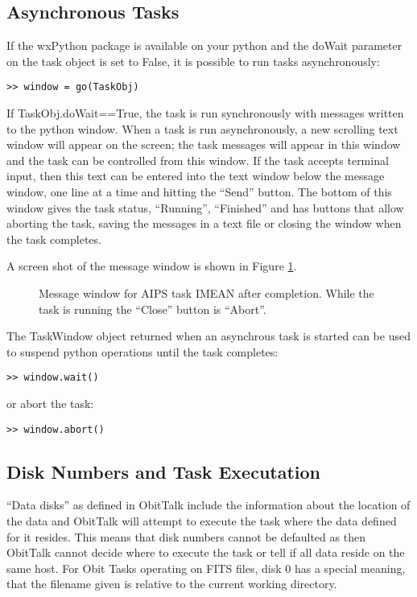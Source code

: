 \documentclass[11pt]{report}
\begin{document}
\subsection{Asynchronous Tasks}
If the wxPython package is available on your python and the doWait
parameter on the task object is set to False, it is possible to
run tasks asynchronously:
\begin{verbatim}
>> window = go(TaskObj)
\end{verbatim}
If TaskObj.doWait==True, the task is run synchronously with messages
written to the python window.
When a task is run asynchronously,  a new scrolling text window will
appear on the screen; the task messages will appear in this window and
the task can be controlled from this window.
If the task accepts terminal input, then this text can be entered into
the text window below the message window, one line at a time and
hitting the ``Send'' button.
The bottom of this window gives the task status, ``Running'',
``Finished'' and has buttons that allow aborting the task, saving
the messages in a text file or closing the window when the task
completes. 

A screen shot of the message window is shown in Figure
\ref{MessWinFig}.
\begin{figure}
\centerline{}
\caption{ 
Message window for AIPS task IMEAN after completion.
While the task is running the ``Close'' button is ``Abort''.
}
\label{MessWinFig}
\end{figure}


The TaskWindow object returned when an asynchrous task is started can
be used to suspend python operations until the task completes:
\begin{verbatim}
>> window.wait()
\end{verbatim}
or abort the task:
\begin{verbatim}
>> window.abort()
\end{verbatim}

\subsection{Disk Numbers and Task Executation}
``Data disks'' as defined in ObitTalk include the information about
the location of the data and ObitTalk will attempt to execute the task
where the data defined for it resides.
This means that disk numbers cannot be defaulted as then ObitTalk
cannot decide where to execute the task or tell if all data reside on
the same host.
For Obit Tasks operating on FITS files, disk 0 has a special meaning,
that the filename given is relative to the current working directory.
\end{document}
